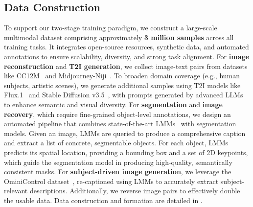

\subsection{Data Construction}
\label{sec:data_construct}

To support our two-stage training paradigm, we construct a large-scale multimodal dataset comprising approximately \textbf{3 million samples} across all training tasks. It integrates open-source resources, synthetic data, and automated annotations to ensure scalability, diversity, and strong task alignment.
For \textbf{image reconstruction} and \textbf{T2I generation}, we collect image-text pairs from datasets like CC12M~\citep{changpinyo2021cc12m} and Midjourney-Niji~\citep{midjourney-niji-1m-llavanext}.  To broaden domain coverage (e.g., human subjects, artistic scenes), we generate additional samples using T2I models like Flux.1~\citep{flux} and Stable Diffusion v3.5~\citep{2024SD3}, with prompts generated by advanced LLMs~\citep{gpt4o} to enhance semantic and visual diversity.
For \textbf{segmentation} and \textbf{image recovery}, which require fine-grained object-level annotations, we design an automated pipeline that combines state-of-the-art LMMs~\citep{Qwen2vl} with segmentation models\citep{sam}. Given an image, LMMs are queried to produce a comprehensive caption and extract a list of concrete, segmentable objects. For each object, LMMs predicts its spatial location, providing a bounding box and a set of 2D keypoints, which guide the segmentation model in producing high-quality, semantically consistent masks.
For \textbf{subject-driven image generation}, we leverage the OminiControl dataset~\citep{OminiControl}, re-captioned using LMMs to accurately extract subject-relevant descriptions. Additionally, we reverse image pairs to effectively double the usable data.
Data construction and formation are detailed in .





